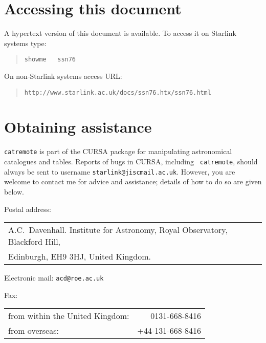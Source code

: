 \documentclass[twoside,11pt]{article}
\newcommand{\htmladdnormallink}[2]{#1}
\renewcommand{\_}{\texttt{\symbol{95}}}
\begin{document}
\newpage
\section*{Accessing this document}

A hypertext version of this document is available.  To access it on
Starlink systems type:

\begin{quote}
{\tt showme ~ ssn76}
\end{quote}

On non-Starlink systems access URL:

\begin{quote}
\htmladdnormallink{
{\tt http://www.starlink.ac.uk/docs/ssn76.htx/ssn76.html}}
{http://www.starlink.ac.uk/docs/ssn75.htx/ssn76.html}
\end{quote}

\section*{Obtaining assistance}

{\tt catremote} is part of the CURSA package for manipulating astronomical
catalogues and tables.  Reports of bugs in CURSA, including {\tt
catremote}, should always be sent to username {\tt starlink@jiscmail.ac.uk}.
However, you are welcome to contact me for advice and assistance; details
of how to do so are given below.

Postal address: \\
\begin{tabular}{l}
A.C.~Davenhall.  Institute for Astronomy, Royal Observatory, Blackford Hill, \\
Edinburgh, EH9 3HJ, United Kingdom.  \\
\end{tabular}


Electronic mail: {\tt acd@roe.ac.uk}


Fax: \\
\begin{tabular}{lr}
from within the United Kingdom: &    0131-668-8416 \\
from overseas:                  & +44-131-668-8416 \\
\end{tabular}

\end{document}
